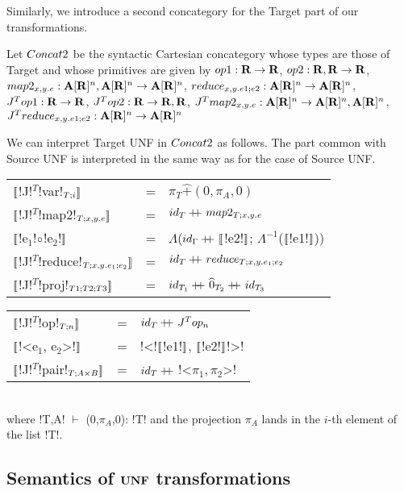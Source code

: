 Similarly, we introduce a second concategory for the Target part of our transformations.

\begin{definition}[$\ConcatT$]
Let $\ConcatT$ be the syntactic Cartesian concategory whose types are those of Target and 
whose primitives are given by 
$op1: \mathbf{R} \to \mathbf{R}$, 
$op2: \mathbf{R},\mathbf{R} \to \mathbf{R}$, 
$map2_{x,y.e}: \mathbf{A}[\mathbf{R}]^{n},\mathbf{A}[\mathbf{R}]^{n}\to \mathbf{A}[\mathbf{R}]^{n}$, 
$reduce_{x,y.e1;e2}: \mathbf{A}[\mathbf{R}]^{n} \to \mathbf{A}[\mathbf{R}]^{n}$, 
$J^Top1: \mathbf{R} \to \mathbf{R}$, 
$J^Top2: \mathbf{R} \to \mathbf{R}, \mathbf{R}$, 
$J^Tmap2_{x,y.e}: \mathbf{A}[\mathbf{R}]^{n} \to \mathbf{A}[\mathbf{R}]^{n}, \mathbf{A}[\mathbf{R}]^{n}$, 
$J^Treduce_{x,y.e1;e2}: \mathbf{A}[\mathbf{R}]^{n} \to \mathbf{A}[\mathbf{R}]^{n}$ 
\end{definition}

We can interpret Target UNF in $\ConcatT$ as follows. 
The part common with Source UNF is interpreted in the same way as for the case of Source UNF.

\begin{tabular}{l c l}
    $\llbracket$!J!$^T$!var!$_{T;i} \rrbracket$ &=& $\pi_T \widehat{+}(0,\pi_A,0)$ \\
    $\llbracket$!J!$^T$!map2!$_{T;x,y.e}\rrbracket$  &=& $id_T+\kern-1.3ex+\kern0.8ex map2_{T;x,y.e}$ \\
    $\llbracket$!e$_1$!$\circ$!e$_2$!$\rrbracket$ &=& $\Lambda$($id_\Gamma+\kern-1.3ex+\kern0.8ex\llbracket$!e2!$\rrbracket$; $\Lambda^{-1}$($\llbracket$!e1!$\rrbracket$)) \\
    $\llbracket$!J!$^T$!reduce!$_{T;x,y.e_1;e_2}\rrbracket$  &=& $id_T+\kern-1.3ex+\kern0.8ex reduce_{T;x,y.e_1;e_2}$ \\
    $\llbracket$!J!$^T$!proj!$_{T1;T2;T3} \rrbracket$ &=& $id_{T_1}+\kern-1.3ex+\kern0.8ex\widehat{0}_{T_2}+\kern-1.3ex+\kern0.8ex id_{T_3}$ 
    \end{tabular}
    \begin{tabular}{l c l}
    $\llbracket$!J!$^T$!op!$_{T;n} \rrbracket$ &=& $id_T+\kern-1.3ex+\kern0.8ex J^Top_n$ \\
    $\llbracket$!<e$_1$, e$_2$>!$\rrbracket$  &=& !<!$\llbracket$!e1!$\rrbracket$, $\llbracket$!e2!$\rrbracket$!>! \\
    $\llbracket$!J!$^T$!pair!$_{T;A\times B} \rrbracket$ &=& $id_T+\kern-1.3ex+\kern0.8ex$!<$\pi_1,\pi_2$>! \\
 \end{tabular}\\
 where !T,A! $\vdash$ (0,$\pi_A$,0): !T! and the projection $\pi_A$ lands in the $i$-th element of the list !T!.

\subsection{Semantics of $\mathbf{UNF}$ transformations} %
\label{sub:Semantics for UNF transformations}

